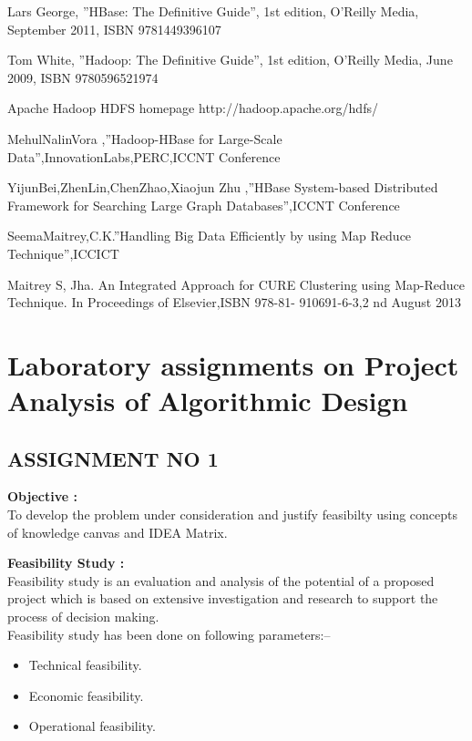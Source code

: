 \documentclass[oneside,a4paper,12pt]{report}
\begin{document}
{\begin{appendices}
\begin{thebibliography}{7}
 Lars George, ”HBase: The Definitive Guide”, 1st edition, O’Reilly Media, September 2011,   ISBN 9781449396107

 Tom White, ”Hadoop: The Definitive Guide”, 1st edition, O’Reilly Media, June 2009, ISBN 9780596521974

 Apache Hadoop HDFS homepage http://hadoop.apache.org/hdfs/

 MehulNalinVora ,”Hadoop-HBase for Large-Scale Data”,InnovationLabs,PERC,ICCNT Conference

 YijunBei,ZhenLin,ChenZhao,Xiaojun Zhu ,”HBase System-based Distributed Framework for Searching Large Graph Databases”,ICCNT Conference

 SeemaMaitrey,C.K.”Handling Big Data Efficiently by using Map Reduce Technique”,ICCICT

 Maitrey S, Jha. An Integrated Approach for CURE Clustering using Map-Reduce Technique. In Proceedings of Elsevier,ISBN 978-81- 910691-6-3,2 nd August 2013


\end{thebibliography}


\chapter{Laboratory assignments on Project Analysis of Algorithmic Design}


\section{ASSIGNMENT NO 1}

\textbf{Objective :} \\

To develop the problem under consideration and justify feasibilty using concepts of knowledge canvas and IDEA Matrix.

\textbf{Feasibility Study : } \\
Feasibility study is an evaluation and analysis of the potential of a proposed project which is based on extensive investigation and research to support the process of decision making.
\\
Feasibility study has been done on following parameters:--
\begin{itemize}
\item Technical feasibility.
\item Economic feasibility.
\item Operational feasibility.
\end{itemize}


\end{appendices}}
\end{document}

